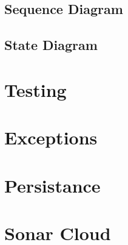 \documentclass[12pt]{article}
\begin{document}
\subsection{Sequence Diagram}
\subsection{State Diagram}
\section{Testing}
\section{Exceptions}
\section{Persistance}
\section{Sonar Cloud}
\end{document}

